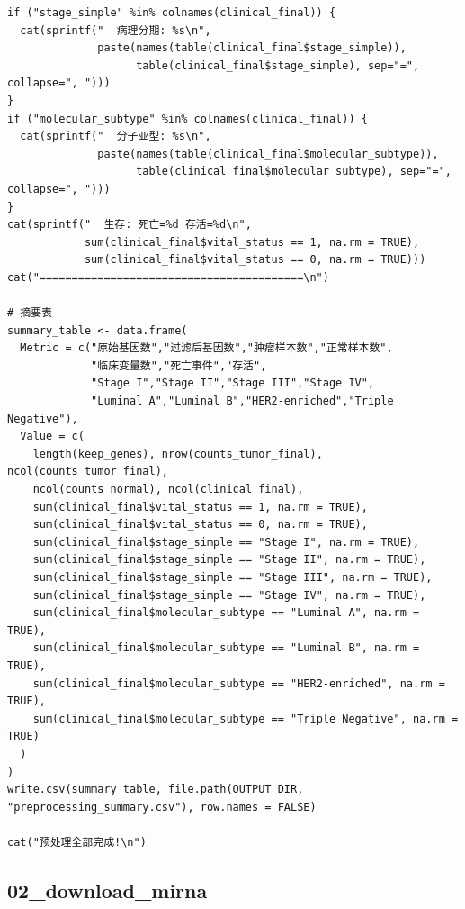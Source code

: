 \documentclass[12pt,a4paper]{ctexart}
\begin{document}
\begin{lstlisting}[caption={01_data_preprocessing}, basicstyle=\ttfamily\scriptsize]
if ("stage_simple" %in% colnames(clinical_final)) {
  cat(sprintf("  病理分期: %s\n",
              paste(names(table(clinical_final$stage_simple)),
                    table(clinical_final$stage_simple), sep="=", collapse=", ")))
}
if ("molecular_subtype" %in% colnames(clinical_final)) {
  cat(sprintf("  分子亚型: %s\n",
              paste(names(table(clinical_final$molecular_subtype)),
                    table(clinical_final$molecular_subtype), sep="=", collapse=", ")))
}
cat(sprintf("  生存: 死亡=%d 存活=%d\n",
            sum(clinical_final$vital_status == 1, na.rm = TRUE),
            sum(clinical_final$vital_status == 0, na.rm = TRUE)))
cat("=========================================\n")

# 摘要表
summary_table <- data.frame(
  Metric = c("原始基因数","过滤后基因数","肿瘤样本数","正常样本数",
             "临床变量数","死亡事件","存活",
             "Stage I","Stage II","Stage III","Stage IV",
             "Luminal A","Luminal B","HER2-enriched","Triple Negative"),
  Value = c(
    length(keep_genes), nrow(counts_tumor_final), ncol(counts_tumor_final),
    ncol(counts_normal), ncol(clinical_final),
    sum(clinical_final$vital_status == 1, na.rm = TRUE),
    sum(clinical_final$vital_status == 0, na.rm = TRUE),
    sum(clinical_final$stage_simple == "Stage I", na.rm = TRUE),
    sum(clinical_final$stage_simple == "Stage II", na.rm = TRUE),
    sum(clinical_final$stage_simple == "Stage III", na.rm = TRUE),
    sum(clinical_final$stage_simple == "Stage IV", na.rm = TRUE),
    sum(clinical_final$molecular_subtype == "Luminal A", na.rm = TRUE),
    sum(clinical_final$molecular_subtype == "Luminal B", na.rm = TRUE),
    sum(clinical_final$molecular_subtype == "HER2-enriched", na.rm = TRUE),
    sum(clinical_final$molecular_subtype == "Triple Negative", na.rm = TRUE)
  )
)
write.csv(summary_table, file.path(OUTPUT_DIR, "preprocessing_summary.csv"), row.names = FALSE)

cat("预处理全部完成!\n")
\end{lstlisting}

\subsection{02_download_mirna}
\end{document}
